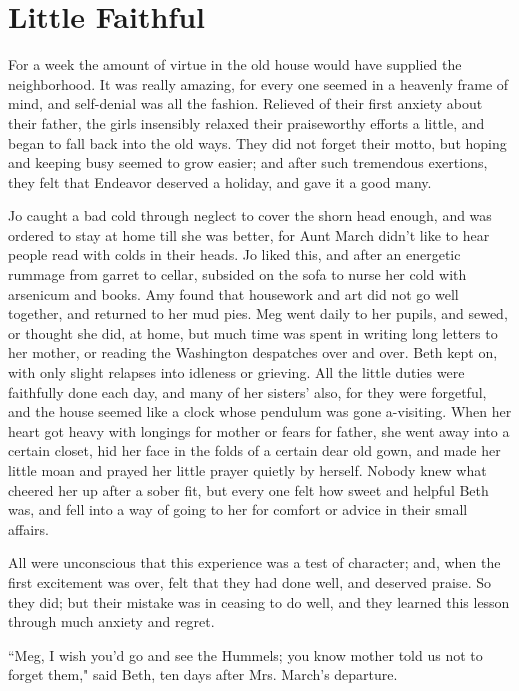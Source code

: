 \chapter{Little Faithful}

{For} a week the amount of virtue in the old house would have supplied
the neighborhood. It was really amazing, for every one seemed in a
heavenly frame of mind, and self-denial was all the fashion. Relieved of
their first anxiety about their father, the girls insensibly relaxed
their praiseworthy efforts a little, and began to fall back into the old
ways. They did not forget their motto, but hoping and keeping busy
seemed to grow easier; and after such tremendous exertions, they felt
that Endeavor deserved a holiday, and gave it a good many.

Jo caught a bad cold through neglect to cover the shorn head enough, and
was ordered to stay at home till she was better, for Aunt March
didn't like to hear people read with colds in their
heads. Jo liked this, and after an energetic rummage from garret to
cellar, subsided on the sofa to nurse her cold with arsenicum and books.
Amy found that housework and art did not go well together, and returned
to her mud pies. Meg went daily to her pupils, and sewed, or thought she
did, at home, but much time was spent in writing long letters to her
mother, or reading the Washington despatches over and over. Beth kept
on, with only slight relapses into idleness or grieving. All the little
duties were faithfully done each day, and many of her
sisters' also, for they were forgetful, and the house
seemed like a clock whose pendulum was gone a-visiting. When her heart
got heavy with longings for mother or fears for father, she went away
into a certain closet, hid her face in the folds of a certain dear old
gown, and made her little moan and prayed her little prayer quietly by
herself. Nobody knew what cheered her up after a sober fit, but every
one felt how sweet and helpful Beth was, and fell into a way of going to
her for comfort or advice in their small affairs.

All were unconscious that this experience was a test of character; and,
when the first excitement was over, felt that they had done well, and
deserved praise. So they did; but their mistake was in ceasing to do
well, and they learned this lesson through much anxiety and regret.

``Meg, I wish you'd go and see the Hummels; you know
mother told us not to forget them," said Beth, ten days after Mrs.
March's departure.

